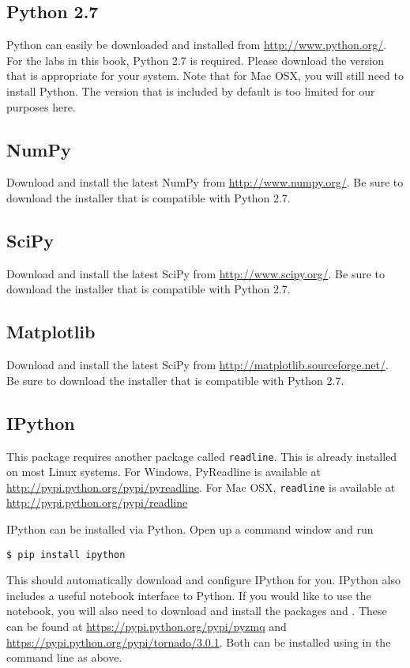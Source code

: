\subsection*{Python 2.7}
Python can easily be downloaded and installed from \url{http://www.python.org/}.  
For the labs in this book, Python 2.7 is required.
Please download the version that is appropriate for your system.  
Note that for Mac OSX, you will still need to install Python.
The version that is included by default is too limited for our purposes here.

\subsection*{NumPy}
Download and install the latest NumPy from \url{http://www.numpy.org/}.  
Be sure to download the installer that is compatible with Python 2.7.

\subsection*{SciPy}
Download and install the latest SciPy from \url{http://www.scipy.org/}. 
Be sure to download the installer that is compatible with Python 2.7.

\subsection*{Matplotlib}
Download and install the latest SciPy from \url{http://matplotlib.sourceforge.net/}.
Be sure to download the installer that is compatible with Python 2.7.

\subsection*{IPython}
This package requires another package called \texttt{readline}.
This is already installed on most Linux systems. 
For Windows, PyReadline is available at \url{http://pypi.python.org/pypi/pyreadline}.
For Mac OSX, \texttt{readline} is available at \url{http://pypi.python.org/pypi/readline}

IPython can be installed via Python.
Open up a command window and run
\begin{lstlisting}
$ pip install ipython
\end{lstlisting}
This should automatically download and configure IPython for you.
IPython also includes a useful notebook interface to Python.
If you would like to use the notebook, you will also need to download and install the packages  and .
These can be found at \url{https://pypi.python.org/pypi/pyzmq} and \url{https://pypi.python.org/pypi/tornado/3.0.1}.
Both can be installed using  in the command line as above.

